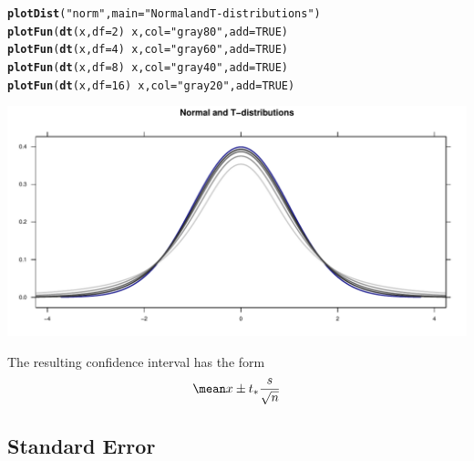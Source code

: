 \documentclass[twoside]{book}\usepackage[]{graphicx}\usepackage[]{xcolor}
\makeatletter
\def\maxwidth{ %
  \ifdim\Gin@nat@width>\linewidth
    \linewidth
  \else
    \Gin@nat@width
  \fi
}
\newcommand{\hlnum}[1]{\textcolor[rgb]{0.686,0.059,0.569}{#1}}%
\newcommand{\hlstr}[1]{\textcolor[rgb]{0.192,0.494,0.8}{#1}}%
\newcommand{\hlopt}[1]{\textcolor[rgb]{0,0,0}{#1}}%
\newcommand{\hlstd}[1]{\textcolor[rgb]{0.345,0.345,0.345}{#1}}%
\newcommand{\hlkwc}[1]{\textcolor[rgb]{0.333,0.667,0.333}{#1}}%
\newcommand{\hlkwd}[1]{\textcolor[rgb]{0.737,0.353,0.396}{\textbf{#1}}}%
\newenvironment{kframe}{%
 \def\at@end@of@kframe{}%
 \ifinner\ifhmode%
  \def\at@end@of@kframe{\end{minipage}}%
  \begin{minipage}{\columnwidth}%
 \fi\fi%
 \def\FrameCommand##1{\hskip\@totalleftmargin \hskip-\fboxsep
 \colorbox{shadecolor}{##1}\hskip-\fboxsep
     \hskip-\linewidth \hskip-\@totalleftmargin \hskip\columnwidth}%
 \MakeFramed {\advance\hsize-\width
   \@totalleftmargin\z@ \linewidth\hsize
   \@setminipage}}%
 {\par\unskip\endMakeFramed%
 \at@end@of@kframe}
\newenvironment{knitrout}{}{} %
\makeatother
\begin{document}
\begin{knitrout}
\color{fgcolor}\begin{kframe}
\begin{alltt}
\hlkwd{plotDist}\hlstd{(}\hlstr{"norm"}\hlstd{,} \hlkwc{main} \hlstd{=} \hlstr{"Normal and T-distributions"}\hlstd{)}
\hlkwd{plotFun}\hlstd{(}\hlkwd{dt}\hlstd{(x,} \hlkwc{df} \hlstd{=} \hlnum{2}\hlstd{)} \hlopt{~} \hlstd{x,} \hlkwc{col} \hlstd{=} \hlstr{"gray80"}\hlstd{,} \hlkwc{add} \hlstd{=} \hlnum{TRUE}\hlstd{)}
\hlkwd{plotFun}\hlstd{(}\hlkwd{dt}\hlstd{(x,} \hlkwc{df} \hlstd{=} \hlnum{4}\hlstd{)} \hlopt{~} \hlstd{x,} \hlkwc{col} \hlstd{=} \hlstr{"gray60"}\hlstd{,} \hlkwc{add} \hlstd{=} \hlnum{TRUE}\hlstd{)}
\hlkwd{plotFun}\hlstd{(}\hlkwd{dt}\hlstd{(x,} \hlkwc{df} \hlstd{=} \hlnum{8}\hlstd{)} \hlopt{~} \hlstd{x,} \hlkwc{col} \hlstd{=} \hlstr{"gray40"}\hlstd{,} \hlkwc{add} \hlstd{=} \hlnum{TRUE}\hlstd{)}
\hlkwd{plotFun}\hlstd{(}\hlkwd{dt}\hlstd{(x,} \hlkwc{df} \hlstd{=} \hlnum{16}\hlstd{)} \hlopt{~} \hlstd{x,} \hlkwc{col} \hlstd{=} \hlstr{"gray20"}\hlstd{,} \hlkwc{add} \hlstd{=} \hlnum{TRUE}\hlstd{)}
\end{alltt}
\end{kframe}

{\centering \includegraphics[width=\maxwidth]{figures/fig-unnamed-chunk-127-1} 

}



\end{knitrout}

The resulting confidence interval has the form
\[
\mean x \pm t_* \frac{s}{\sqrt{n}}
\]



\subsection{Standard Error}
\end{document}
